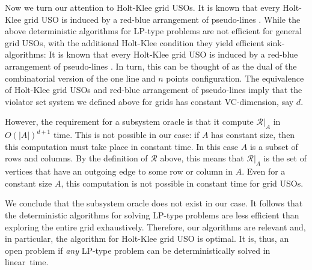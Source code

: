 \documentclass[runningheads,a4paper]{llncs}
\begin{document}
Now we turn our attention to Holt-Klee grid USOs. It is known that every Holt-Klee grid USO is induced by a red-blue arrangement of pseudo-lines \cite{grid05,falkthesis}. 
While the above deterministic algorithms for LP-type problems are not efficient for general grid USOs, with the additional Holt-Klee condition they yield efficient sink-algorithms:
It is known that every Holt-Klee grid USO is induced by a red-blue arrangement of pseudo-lines \cite{grid05,falkthesis}. 
In turn, this can be thought of as the dual of the combinatorial version of the one line and $n$ points configuration.
The equivalence of Holt-Klee grid USOs and red-blue arrangement of pseudo-lines imply that the violator set system we defined above for grids 
has constant VC-dimension, say $d$. 

However, the requirement for a subsystem oracle is that it compute $\mathcal R|_A$ in $O(|A|)^{d+1}$ time.
This is not possible in our case: if $A$ has constant size, then this computation must take place in constant time.  
In this case $A$ is a subset of rows and columns. By the definition of $\mathcal R$ above, this means 
that $\mathcal R|_A$ is the set of vertices that have an outgoing edge to some row or column in $A$.
Even for a constant size $A$, this computation is not possible in constant time for grid USOs.

We conclude that the subsystem oracle does not exist in our case. It follows that the deterministic algorithms 
for solving LP-type problems are less efficient than exploring the entire grid exhaustively.  Therefore, 
our algorithms are relevant and, in particular, the algorithm for Holt-Klee grid USO is optimal.
It is, thus, an open problem if \emph{any} LP-type problem can be deterministically solved in linear~time. 
\end{document}
